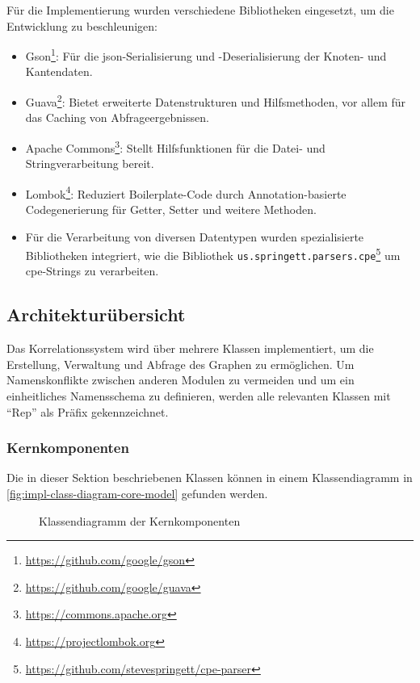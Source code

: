 Für die Implementierung wurden verschiedene Bibliotheken eingesetzt, um die Entwicklung zu beschleunigen:

\begin{itemize}
    \itemsep0em
    \item Gson\footnote{\url{https://github.com/google/gson}}: Für die \acrshort{json}-Serialisierung und -Deserialisierung der Knoten- und Kantendaten.
    \item Guava\footnote{\url{https://github.com/google/guava}}: Bietet erweiterte Datenstrukturen und Hilfsmethoden, vor allem für das Caching von Abfrageergebnissen.
    \item Apache Commons\footnote{\url{https://commons.apache.org}}: Stellt Hilfsfunktionen für die Datei- und Stringverarbeitung bereit.
    \item Lombok\footnote{\url{https://projectlombok.org}}: Reduziert Boilerplate-Code durch Annotation-basierte Codegenerierung für Getter, Setter und weitere Methoden.
    \item Für die Verarbeitung von diversen Datentypen wurden spezialisierte Bibliotheken integriert, wie die Bibliothek \texttt{us.springett.parsers.cpe}\footnote{\url{https://github.com/stevespringett/cpe-parser}} um \acrshort{cpe}-Strings zu verarbeiten.
\end{itemize}

\subsection{Architekturübersicht}\label{subsec:impl-arch-overview}

Das Korrelationssystem wird über mehrere Klassen implementiert, um die Erstellung, Verwaltung und Abfrage des Graphen zu ermöglichen.
Um Namenskonflikte zwischen anderen Modulen zu vermeiden und um ein einheitliches Namensschema zu definieren, werden alle relevanten Klassen mit \enquote{Rep} als Präfix gekennzeichnet.

\subsubsection{Kernkomponenten}

Die in dieser Sektion beschriebenen Klassen können in einem Klassendiagramm in \autoref{fig:impl-class-diagram-core-model} gefunden werden.

\begin{figure}[htbp]
    \centering
    \makebox[\textwidth]{}
    \caption{Klassendiagramm der Kernkomponenten}
    \label{fig:impl-class-diagram-core-model}
\end{figure}

